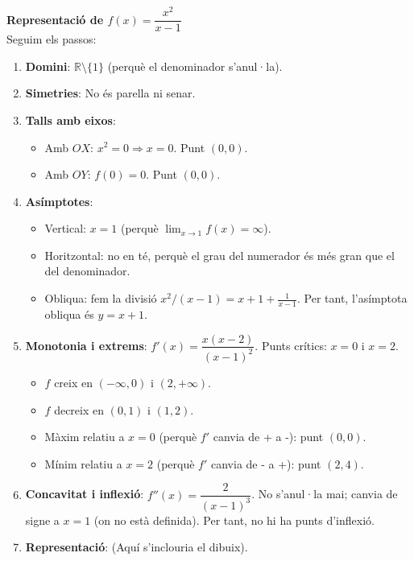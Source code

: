 \documentclass[12pt]{article}
\begin{document}
\begin{exemple}
\textbf{Representació de $f(x)=\dfrac{x^2}{x-1}$}\\
Seguim els passos:
\begin{enumerate}
    \item \textbf{Domini}: $\mathbb{R}\setminus\{1\}$ (perquè el denominador s'anul·la).
    \item \textbf{Simetries}: No és parella ni senar.
    \item \textbf{Talls amb eixos}:
        \begin{itemize}
            \item Amb $OX$: $x^2=0 \Rightarrow x=0$. Punt $(0,0)$.
            \item Amb $OY$: $f(0)=0$. Punt $(0,0)$.
        \end{itemize}
    \item \textbf{Asímptotes}:
        \begin{itemize}
            \item Vertical: $x=1$ (perquè $\lim_{x\to1} f(x)=\infty$).
            \item Horitzontal: no en té, perquè el grau del numerador és més gran que el del denominador.
            \item Obliqua: fem la divisió $x^2/(x-1)=x+1+\frac{1}{x-1}$. Per tant, l'asímptota obliqua és $y=x+1$.
        \end{itemize}
    \item \textbf{Monotonia i extrems}: $f'(x)=\dfrac{x(x-2)}{(x-1)^2}$. Punts crítics: $x=0$ i $x=2$.
        \begin{itemize}
            \item $f$ creix en $(-\infty,0)$ i $(2,+\infty)$.
            \item $f$ decreix en $(0,1)$ i $(1,2)$.
            \item Màxim relatiu a $x=0$ (perquè $f'$ canvia de + a -): punt $(0,0)$.
            \item Mínim relatiu a $x=2$ (perquè $f'$ canvia de - a +): punt $(2,4)$.
        \end{itemize}
    \item \textbf{Concavitat i inflexió}: $f''(x)=\dfrac{2}{(x-1)^3}$. No s'anul·la mai; canvia de signe a $x=1$ (on no està definida). Per tant, no hi ha punts d'inflexió.
    \item \textbf{Representació}: (Aquí s'inclouria el dibuix).
\end{enumerate}
\end{exemple}
\end{document}
